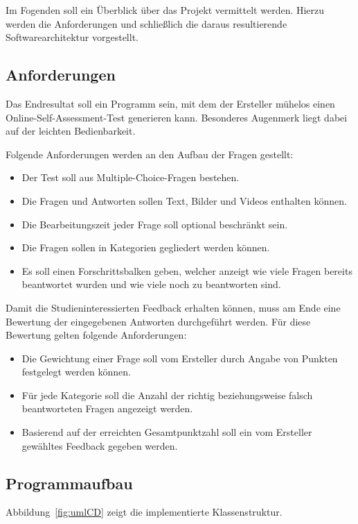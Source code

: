 \label{Architektur}
Im Fogenden soll ein Überblick über das Projekt vermittelt werden.
Hierzu werden die Anforderungen und schließlich die daraus resultierende Softwarearchitektur vorgestellt.

\subsection{Anforderungen}
Das Endresultat soll ein Programm sein, mit dem der Ersteller mühelos einen Online-Self-Assessment-Test generieren kann. 
Besonderes Augenmerk liegt dabei auf der leichten Bedienbarkeit.

Folgende Anforderungen werden an den Aufbau der Fragen gestellt:
\begin{itemize}
	\item Der Test soll aus Multiple-Choice-Fragen bestehen.
	\item Die Fragen und Antworten  sollen Text, Bilder und Videos enthalten können.
	\item Die Bearbeitungszeit jeder Frage soll optional beschränkt sein.
	\item Die Fragen sollen in Kategorien gegliedert werden können.
	\item Es soll einen Forschrittsbalken geben, welcher anzeigt wie viele Fragen bereits beantwortet wurden und wie viele noch zu beantworten sind.
\end{itemize}

Damit die Studieninteressierten Feedback erhalten können, muss am Ende eine Bewertung der eingegebenen Antworten durchgeführt werden.
Für diese Bewertung gelten folgende Anforderungen:
\begin{itemize}
	\item Die Gewichtung einer Frage soll vom Ersteller durch Angabe von Punkten festgelegt werden können.
	\item Für jede Kategorie soll die Anzahl der richtig beziehungsweise falsch beantworteten Fragen angezeigt werden.
	\item Basierend auf der erreichten Gesamtpunktzahl soll ein vom Ersteller gewähltes Feedback gegeben werden.
\end{itemize}

\subsection{Programmaufbau}
Abbildung~\ref{fig:umlCD} zeigt die implementierte Klassenstruktur.

